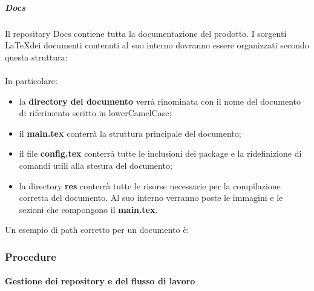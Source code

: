 \subparagraph*{Docs}
Il repository Docs contiene tutta la documentazione del prodotto. I sorgenti \LaTeX \space dei documenti contenuti al suo interno dovranno essere organizzati secondo questa struttura:\\\\

\vspace{1cm}
\noindent In particolare:
\begin{itemize}
	\item la \textbf{directory del documento} verrà rinominata con il nome del documento di riferimento scritto in lowerCamelCase;
	\item il \textbf{main.tex} conterrà la struttura principale del documento;
	\item il file \textbf{config.tex} conterrà tutte le inclusioni dei package e la ridefinizione di comandi utili alla stesura del documento;
	\item la directory \textbf{res} conterrà tutte le risorse necessarie per la compilazione corretta del documento. Al suo interno verranno poste le immagini e le sezioni che compongono il \textbf{main.tex}.
\end{itemize}
Un esempio di path corretto per un documento è:\\

\centerline{}
\vspace{0.7cm}

\subsubsection{Procedure}
\paragraph{Gestione dei repository e del flusso di lavoro}

